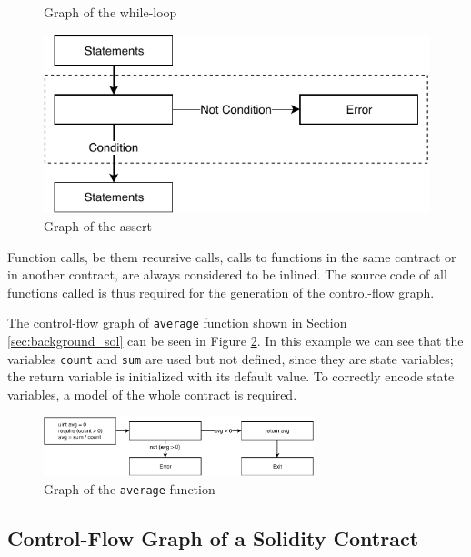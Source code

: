 \begin{figure}[ht]
\begin{minipage}[h]{0.45\textwidth}
    \caption{Graph of the while-loop}
    \label{fig:cfg_while}
  \end{minipage}
  \hfill
  \begin{minipage}[h]{0.45\textwidth}
  	\centering
    \includegraphics[width=\textwidth]{images/assert}
    \caption{Graph of the assert}
    \label{fig:cfg_assert}
  \end{minipage}
\end{figure}

Function calls, be them  recursive calls, calls to functions in the same contract or in another contract, are always considered to be inlined. The source code of all functions called is thus required for the generation of the control-flow graph.

The control-flow graph of \texttt{average} function shown in Section \ref{sec:background_sol} can be seen in Figure \ref{fig:cfg_average}. In this example we can see that the variables \texttt{count} and \texttt{sum} are used but not defined, since they are state variables; the return variable is initialized with its default value. To correctly encode state variables, a model of the whole contract is required.

\begin{figure}[ht]
	\centering
	\includegraphics[width=0.7\textwidth]{images/average}
	\caption{Graph of the \texttt{average} function}
	\label{fig:cfg_average}
\end{figure}


\subsection{Control-Flow Graph of a Solidity Contract} \label{sec:sol_cfg_con}

